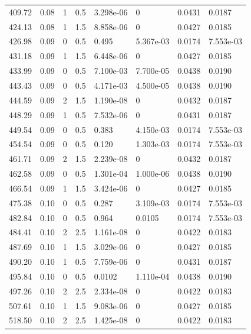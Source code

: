 \documentclass[preview]{standalone}
\begin{document}
{{{\begin{tabular}{L{1.2cm}C{1.2cm} C{0.3cm}C{0.5cm} C{1.4cm}C{1.4cm} C{1.4cm}C{1.4cm}}
  409.72  &  0.08  & 1     & 0.5 &  3.298e-06  & 0  & 0.0431 &  0.0187   \\ 
  424.13  &  0.08  & 1     & 1.5 &  8.858e-06  & 0  & 0.0427 &  0.0185   \\ 
  426.98  &  0.09  & 0     & 0.5 &  0.495  & 5.367e-03  & 0.0174 &  7.553e-03   \\ 
  431.18  &  0.09  & 1     & 1.5 &  6.448e-06  & 0  & 0.0427 &  0.0185   \\ 
  433.99  &  0.09  & 0     & 0.5 &  7.100e-03  & 7.700e-05  & 0.0438 &  0.0190   \\ 
  443.43  &  0.09  & 0     & 0.5 &  4.171e-03  & 4.500e-05  & 0.0438 &  0.0190   \\ 
  444.59  &  0.09  & 2     & 1.5 &  1.190e-08  & 0  & 0.0432 &  0.0187   \\ 
  448.29  &  0.09  & 1     & 0.5 &  7.532e-06  & 0  & 0.0431 &  0.0187   \\ 
  449.54  &  0.09  & 0     & 0.5 &  0.383  & 4.150e-03  & 0.0174 &  7.553e-03   \\ 
  454.54  &  0.09  & 0     & 0.5 &  0.120  & 1.303e-03  & 0.0174 &  7.553e-03   \\ 
  461.71  &  0.09  & 2     & 1.5 &  2.239e-08  & 0  & 0.0432 &  0.0187   \\ 
  462.58  &  0.09  & 0     & 0.5 &  1.301e-04  & 1.000e-06  & 0.0438 &  0.0190   \\ 
  466.54  &  0.09  & 1     & 1.5 &  3.424e-06  & 0  & 0.0427 &  0.0185   \\ 
  475.38  &  0.10  & 0     & 0.5 &  0.287  & 3.109e-03  & 0.0174 &  7.553e-03   \\ 
  482.84  &  0.10  & 0     & 0.5 &  0.964  & 0.0105  & 0.0174 &  7.553e-03   \\ 
  484.41  &  0.10  & 2     & 2.5 &  1.161e-08  & 0  & 0.0422 &  0.0183   \\ 
  487.69  &  0.10  & 1     & 1.5 &  3.029e-06  & 0  & 0.0427 &  0.0185   \\ 
  490.20  &  0.10  & 1     & 0.5 &  7.759e-06  & 0  & 0.0431 &  0.0187   \\ 
  495.84  &  0.10  & 0     & 0.5 &  0.0102  & 1.110e-04  & 0.0438 &  0.0190   \\ 
  497.26  &  0.10  & 2     & 2.5 &  2.334e-08  & 0  & 0.0422 &  0.0183   \\ 
  507.61  &  0.10  & 1     & 1.5 &  9.083e-06  & 0  & 0.0427 &  0.0185   \\ 
  518.50  &  0.10  & 2     & 2.5 &  1.425e-08  & 0  & 0.0422 &  0.0183   \\ 

\end{tabular}}}}
\end{document}
